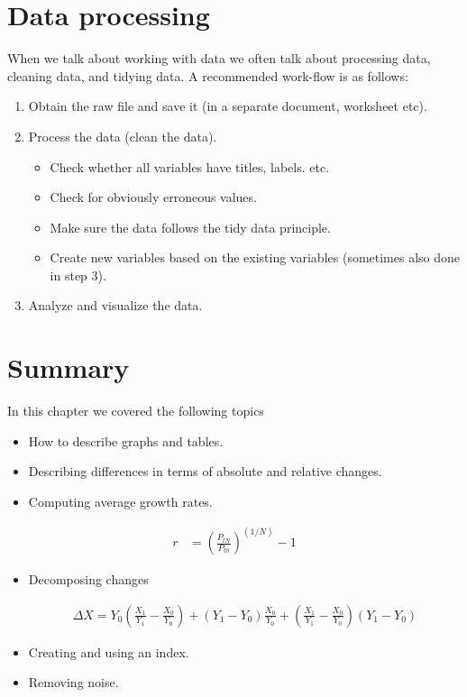 \documentclass[
]{book}
\providecommand{\tightlist}{%
  \setlength{\itemsep}{0pt}\setlength{\parskip}{0pt}}
\begin{document}
\hypertarget{data-processing}{%
\section{Data processing}\label{data-processing}}

When we talk about working with data we often talk about processing data, cleaning data, and tidying data. A recommended work-flow is as follows:

\begin{enumerate}
\def\labelenumi{\arabic{enumi}.}
\item
  Obtain the raw file and save it (in a separate document, worksheet etc).
\item
  Process the data (clean the data).

  \begin{itemize}
  \tightlist
  \item
    Check whether all variables have titles, labels. etc.
  \item
    Check for obviously erroneous values.
  \item
    Make sure the data follows the tidy data principle.
  \item
    Create new variables based on the existing variables (sometimes also done in step 3).
  \end{itemize}
\item
  Analyze and visualize the data.
\end{enumerate}

\hypertarget{summary-2}{%
\section{Summary}\label{summary-2}}

In this chapter we covered the following topics

\begin{itemize}
\tightlist
\item
  How to describe graphs and tables.
\item
  Describing differences in terms of absolute and relative changes.
\item
  Computing average growth rates.
\end{itemize}

\begin{align}
   r&=\left(\frac{P_{tN}}{P_{t0}}\right)^{(1/N)}-1\nonumber
\end{align}

\begin{itemize}
\item
  Decomposing changes

  \begin{align}
  \Delta X=Y_0\left(\frac{X_1}{Y_1}-\frac{X_0}{Y_0}\right)+\left(Y_1-Y_0\right)\frac{X_0}{Y_0}+
  \left(\frac{X_1}{Y_1}-\frac{X_0}{Y_0}\right)\left(Y_1-Y_0\right)\nonumber
  \end{align}
\item
  Creating and using an index.
\item
  Removing noise.
\end{itemize}
\end{document}
